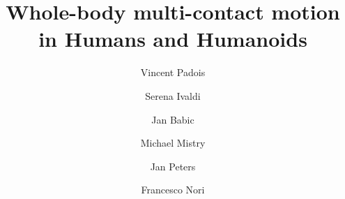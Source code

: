 \documentclass[final,5p,twocolumn]{elsarticle}
\begin{document}
\begin{frontmatter}



\title{Whole-body multi-contact motion in Humans and Humanoids}


\author{Vincent Padois}
\address{Sorbonne Universit\'{e}s, UPMC Univ Paris 06, UMR 7222, Institut des Syst\`{e}mes Intelligents et de Robotique, F-75005, Paris, France\\CNRS, UMR 7222, Institut des Syst\`{e}mes Intelligents et de Robotique F-75005, Paris, France. Email: vincent.padois@upmc.fr }

\author{Serena Ivaldi}
\address{French Institute for Research in Computer Science and Automation (INRIA) Nancy Grand-Est, France. Email: serena.ivaldi@inria.fr}

\author{Jan Babic}
\address{Faculty of Electrical Engineering Josef Stefan Institute, Slovenia Email: jan.babic@ijs.si}

\author{Michael Mistry }
\address{University of Birmingham, UK Email: m.n.mistry@bham.ac.uk}

\author{Jan Peters}
\address{Max Planck Institute for Intelligent Systems and TU Darmstadt, Germany
Email: mail@jan-peters.net}

\author{Francesco Nori}
\address{Robotics, Brain and Cognitive Science Department Istituto Italiano di Tecnologia. Email: francesco.nori@iit.it}



\end{frontmatter}
\end{document}
